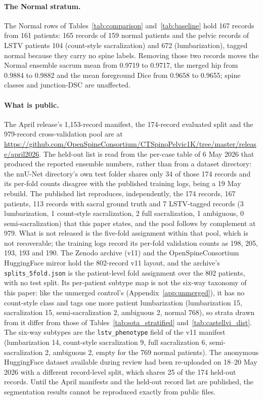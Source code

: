 \paragraph{The Normal stratum.}
The Normal rows of Tables~\ref{tab:comparison}
and~\ref{tab:baseline} hold 167 records from 161
patients: 165 records of 159 normal patients and the
pelvic records of LSTV patients 104 (count-style
sacralization) and 672 (lumbarization), tagged normal
because they carry no spine labels. Removing those two
records moves the Normal ensemble sacrum mean from 0.9719
to 0.9717, the merged hip from 0.9884 to 0.9882 and the
mean foreground Dice from 0.9658 to 0.9655; spine classes
and junction-DSC are unaffected.

\paragraph{What is public.}
The April release's 1{,}153-record manifest, the
174-record evaluated split and the 979-record
cross-validation pool are at
\url{https://github.com/OpenSpineConsortium/CTSpinoPelvic1K/tree/master/release/april2026}. The held-out list is read from the
per-case table of 6 May 2026 that produced the reported
ensemble numbers, rather than from a dataset directory:
the nnU-Net directory's own test folder shares only 34 of
those 174 records and its per-fold counts disagree with
the published training logs, being a 19 May rebuild. The
published list reproduces, independently, the 174
records, 167 patients, 113 records with sacral ground
truth and 7 LSTV-tagged records (3 lumbarization, 1
count-style sacralization, 2 full sacralization, 1
ambiguous, 0 semi-sacralization) that this paper states,
and the pool follows by complement at 979. What is not
released is the five-fold assignment within that pool,
which is not recoverable; the training logs record its
per-fold validation counts as 198, 205, 193, 193 and 190.
The Zenodo archive (v11) and the OpenSpineConsortium
HuggingFace mirror hold the 802-record v11 layout, and the
archive's \texttt{splits\_5fold.json} is the patient-level
fold assignment over the 802 patients, with no test split.
Its per-patient subtype map is not the six-way taxonomy of
this paper: like the unmerged control's
(Appendix~\ref{app:unmerged}), it has no count-style class
and tags one more patient lumbarization (lumbarization 15,
sacralization 15, semi-sacralization 2, ambiguous 2, normal
768), so strata drawn from it differ from those of
Tables~\ref{tab:sota_stratified}
and~\ref{tab:castellvi_dist}. The six-way subtypes are the
\texttt{lstv\_phenotype} field of the v11 manifest
(lumbarization 14, count-style sacralization 9, full
sacralization 6, semi-sacralization 2, ambiguous 2, empty
for the 769 normal patients).
The anonymous HuggingFace dataset available during review
had been re-uploaded on 18--20 May 2026 with a different
record-level split, which shares 25 of the 174 held-out
records. Until the April manifests and the held-out record
list are published, the segmentation results cannot be
reproduced exactly from public files.
